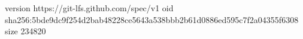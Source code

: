 version https://git-lfs.github.com/spec/v1
oid sha256:5bde9dc9f254d2bab48228ce5643a538bbb2b61d0886ed595c7f2a04355f6308
size 234820
